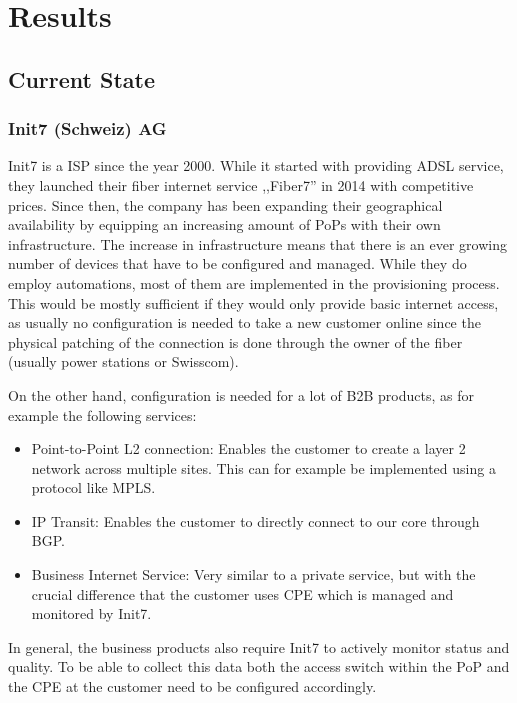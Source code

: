 \chapter{\label{results}Results}
\thispagestyle{fancy}

\section{Current State}

\subsection{Init7 (Schweiz) AG}

Init7 is a \acrshort{ISP} since the year 2000. While it started with providing \acrshort{ADSL} service, they launched their fiber internet service
,,Fiber7'' in 2014 with competitive prices. Since then, the company has been expanding their geographical availability by
equipping an increasing amount of PoPs with their own infrastructure. The increase in infrastructure means that there is
an ever growing number of devices that have to be configured and managed. While they do employ automations, most of them
are implemented in the provisioning process. This would be mostly sufficient if they would only provide basic internet access,
as usually no configuration is needed to take a new customer online since the physical patching of the connection is done through
the owner of the fiber (usually power stations or Swisscom).

On the other hand, configuration is needed for a lot of \acrfull{B2B} products, as for example the following services:
\begin{itemize}
    \item Point-to-Point L2 connection: Enables the customer to create a layer 2 network across multiple sites.
      This can for example be implemented using a protocol like \acrshort{MPLS}.
    \item IP Transit: Enables the customer to directly connect to our core through \acrshort{BGP}.
    \item Business Internet Service: Very similar to a private service, but with the crucial difference that the customer
       uses \acrfull{CPE} which is managed and monitored by Init7.
\end{itemize}

In general, the business products also require Init7 to actively monitor status and quality. To be able to collect this data
both the access switch within the \acrfull{PoP} and the \acrshort{CPE} at the customer need to be configured accordingly.

